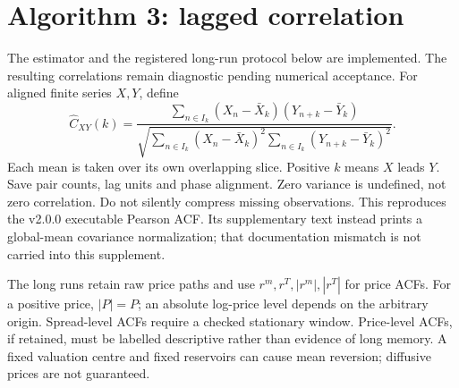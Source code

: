 \documentclass[11pt,a4paper]{article}
\begin{document}
\section{Algorithm 3: lagged correlation}
The estimator and the registered long-run protocol below are implemented.
The resulting correlations remain diagnostic pending numerical acceptance. For aligned finite series $X,Y$, define
\[
 \widehat C_{XY}(k)=
 \frac{\sum_{n\in I_k}(X_n-\bar X_k)(Y_{n+k}-\bar Y_k)}
 {\sqrt{\sum_{n\in I_k}(X_n-\bar X_k)^2
              \sum_{n\in I_k}(Y_{n+k}-\bar Y_k)^2}}.
\]
Each mean is taken over its own overlapping slice. Positive $k$ means $X$
leads $Y$. Save pair counts, lag units and phase alignment. Zero variance is
undefined, not zero correlation. Do not silently compress missing observations.
This reproduces the v2.0.0 executable Pearson ACF. Its supplementary text
instead prints a global-mean covariance normalization; that documentation
mismatch is not carried into this supplement.

The long runs retain raw price paths and use $r^m,r^T,|r^m|,|r^T|$ for
price ACFs. For a positive price, $|P|=P$; an absolute log-price level depends
on the arbitrary origin. Spread-level ACFs require a checked stationary
window. Price-level ACFs, if retained, must be labelled descriptive rather
than evidence of long memory. A fixed valuation centre and fixed reservoirs
can cause mean reversion; diffusive prices are not guaranteed.

\newpage
\end{document}
